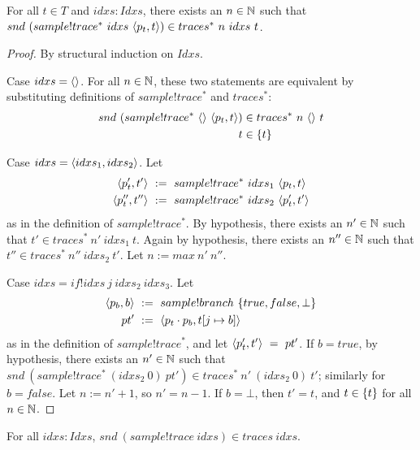 \begin{theorem}
For all $t \in T$ and $idxs: Idxs$, there exists an $n \in \mathbb{N}$ such that $snd~(sample!trace^*~idxs~\langle{p_t,t}\rangle) \in traces^*~n~idxs~t$.
\end{theorem}
\begin{proof}
By structural induction on $Idxs$.

Case $idxs = \langle{}\rangle$.
For all $n \in \mathbb{N}$, these two statements are equivalent by substituting definitions of $sample!trace^*$ and $traces^*$:
\begin{equation}
\begin{aligned}
	snd~(sample!trace^*~\langle{}\rangle~\langle{p_t,t}\rangle) &\in traces^*~n~\langle{}\rangle~t \\
	t &\in \{{t}\}
\end{aligned}
\end{equation}

Case $idxs = \langle{idxs_1,idxs_2}\rangle$.
Let
\begin{equation}
\begin{aligned}
	\langle{p_t',t'}\rangle&\ :=\ sample!trace^*~idxs_1~\langle{p_t,t}\rangle \\
	\langle{p_t'',t''}\rangle&\ :=\ sample!trace^*~idxs_2~\langle{p_t',t'}\rangle
\end{aligned}
\end{equation}
as in the definition of $sample!trace^*$.
By hypothesis, there exists an $n' \in \mathbb{N}$ such that $t' \in traces^*~n'~idxs_1~t$.
Again by hypothesis, there exists an $n'' \in \mathbb{N}$ such that $t'' \in traces^*~n''~idxs_2~t'$.
Let $n := max~n'~n''$.

Case $idxs = if!idxs~j~idxs_2~idxs_3$.
Let
\begin{equation}
\begin{aligned}
	\langle{p_b,b}\rangle&\ :=\ sample!branch~\{{true,false,\bot}\} \\
	pt' &\ :=\ \langle{p_t \cdot p_b, t[j \mapsto b]}\rangle
\end{aligned}
\end{equation}
as in the definition of $sample!trace^*$, and let $\langle{p_t',t'}\rangle\ =\ pt'$.
If $b = true$, by hypothesis, there exists an $n' \in \mathbb{N}$ such that $snd~(sample!trace^*~(idxs_2~0)~pt') \in traces^*~n'~(idxs_2~0)~t'$; similarly for $b = false$. Let $n := n' + 1$, so $n' = n - 1$.
If $b = \bot$, then $t' = t$, and $t \in \{{t}\}$ for all $n \in \mathbb{N}$.
\end{proof}

\begin{corollary}
For all $idxs : Idxs$, $snd~(sample!trace~idxs) \in traces~idxs$.
\end{corollary}


